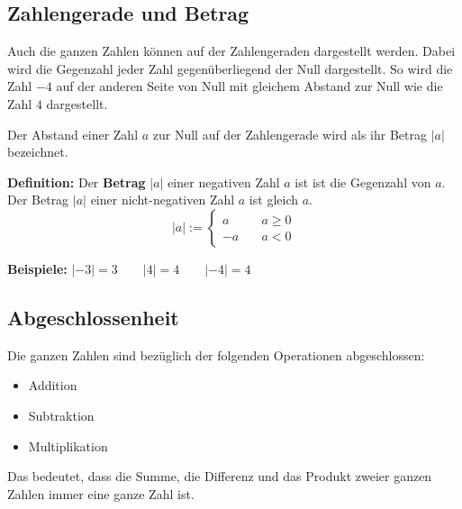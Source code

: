 \subsection{Zahlengerade und Betrag}

Auch die ganzen Zahlen können auf der Zahlengeraden dargestellt werden. Dabei wird die Gegenzahl jeder Zahl gegenüberliegend der Null dargestellt. So wird die Zahl $-4$ auf der anderen Seite von Null mit gleichem Abstand zur Null wie die Zahl $4$ dargestellt.
\begin{center}
\end{center}

Der Abstand einer Zahl $a$ zur Null auf der Zahlengerade wird als ihr Betrag $|a|$ bezeichnet.

\textbf{Definition:} Der \textbf{Betrag} $|a|$ einer negativen Zahl $a$ ist ist die Gegenzahl von $a$. Der Betrag $|a|$ einer nicht-negativen Zahl $a$ ist gleich $a$.
\[
  |a| := \begin{cases}
    a &\quad a \geq 0 \\
    -a &\quad a < 0
  \end{cases}
\]
\begin{example}
  \textbf{Beispiele:} $|-3| = 3 \qquad |4| = 4 \qquad |-4| = 4$
\end{example}

\subsection{Abgeschlossenheit}

Die ganzen Zahlen sind bezüglich der folgenden Operationen abgeschlossen:
\begin{itemize}[noitemsep]
  \item Addition
  \item Subtraktion
  \item Multiplikation
\end{itemize}
Das bedeutet, dass die Summe, die Differenz und das Produkt zweier ganzen Zahlen immer eine ganze Zahl ist.


